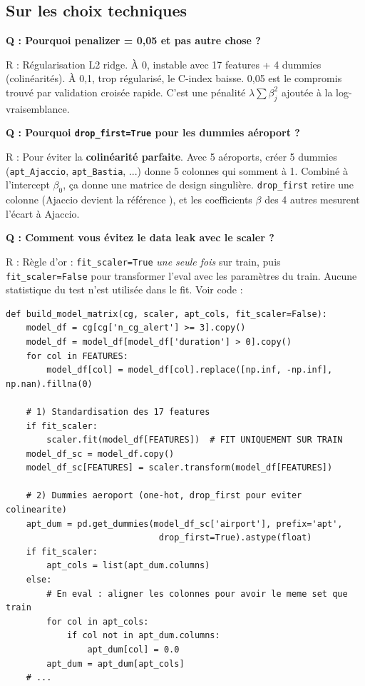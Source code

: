 \documentclass[11pt,a4paper]{article}
\begin{document}
\subsection*{Sur les choix techniques}

\begin{piege}
\textbf{Q : Pourquoi penalizer = 0,05 et pas autre chose ?}

R : Régularisation L2 ridge. À 0, instable avec 17 features + 4 dummies (colinéarités).
À 0,1, trop régularisé, le C-index baisse. 0,05 est le compromis trouvé par validation
croisée rapide. C'est une pénalité $\lambda \sum \beta_j^2$ ajoutée à la log-vraisemblance.
\end{piege}

\begin{piege}
\textbf{Q : Pourquoi \texttt{drop\_first=True} pour les dummies aéroport ?}

R : Pour éviter la \textbf{colinéarité parfaite}. Avec 5 aéroports, créer 5 dummies
(\texttt{apt\_Ajaccio}, \texttt{apt\_Bastia}, ...) donne 5 colonnes qui somment à 1.
Combiné à l'intercept $\beta_0$, ça donne une matrice de design singulière.
\texttt{drop\_first} retire une colonne (Ajaccio devient la \og référence \fg{}), et les
coefficients $\beta$ des 4 autres mesurent l'écart à Ajaccio.
\end{piege}

\begin{piege}
\textbf{Q : Comment vous évitez le data leak avec le scaler ?}

R : Règle d'or : \texttt{fit\_scaler=True} \emph{une seule fois} sur train, puis
\texttt{fit\_scaler=False} pour transformer l'eval avec les paramètres du train. Aucune
statistique du test n'est utilisée dans le fit. Voir code :
\end{piege}

\begin{lstlisting}[caption={Standardisation sans leak (build\_model\_matrix).}]
def build_model_matrix(cg, scaler, apt_cols, fit_scaler=False):
    model_df = cg[cg['n_cg_alert'] >= 3].copy()
    model_df = model_df[model_df['duration'] > 0].copy()
    for col in FEATURES:
        model_df[col] = model_df[col].replace([np.inf, -np.inf], np.nan).fillna(0)

    # 1) Standardisation des 17 features
    if fit_scaler:
        scaler.fit(model_df[FEATURES])  # FIT UNIQUEMENT SUR TRAIN
    model_df_sc = model_df.copy()
    model_df_sc[FEATURES] = scaler.transform(model_df[FEATURES])

    # 2) Dummies aeroport (one-hot, drop_first pour eviter colinearite)
    apt_dum = pd.get_dummies(model_df_sc['airport'], prefix='apt',
                              drop_first=True).astype(float)
    if fit_scaler:
        apt_cols = list(apt_dum.columns)
    else:
        # En eval : aligner les colonnes pour avoir le meme set que train
        for col in apt_cols:
            if col not in apt_dum.columns:
                apt_dum[col] = 0.0
        apt_dum = apt_dum[apt_cols]
    # ...
\end{lstlisting}
\end{document}
